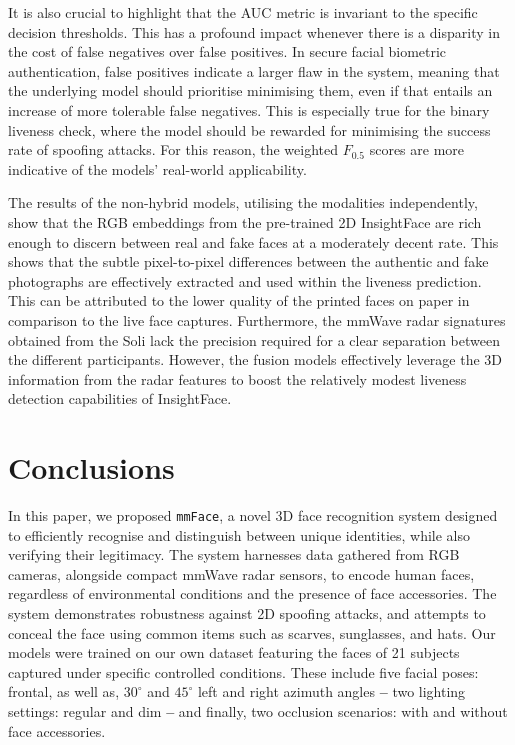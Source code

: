 \documentclass{mpaper}
\begin{document}
It is also crucial to highlight that the AUC metric is invariant to the specific decision thresholds. This has a profound impact whenever there is a disparity in the cost of false negatives over false positives. In secure facial biometric authentication, false positives indicate a larger flaw in the system, meaning that the underlying model should prioritise minimising them, even if that entails an increase of more tolerable false negatives. This is especially true for the binary liveness check, where the model should be rewarded for minimising the success rate of spoofing attacks. For this reason, the weighted $F_{0.5}$ scores are more indicative of the models' real-world applicability. 

The results of the non-hybrid models, utilising the modalities independently, show that the RGB embeddings from the pre-trained 2D InsightFace are rich enough to discern between real and fake faces at a moderately decent rate. This shows that the subtle pixel-to-pixel differences between the authentic and fake photographs are effectively extracted and used within the liveness prediction. This can be attributed to the lower quality of the printed faces on paper in comparison to the live face captures. Furthermore, the mmWave radar signatures obtained from the Soli lack the precision required for a clear separation between the different participants. However, the fusion models effectively leverage the 3D information from the radar features to boost the relatively modest liveness detection capabilities of InsightFace.



\section{Conclusions}
In this paper, we proposed \texttt{mmFace}, a novel 3D face recognition system designed to efficiently recognise and distinguish between unique identities, while also verifying their legitimacy. The system harnesses data gathered from RGB cameras, alongside compact mmWave radar sensors, to encode human faces, regardless of environmental conditions and the presence of face accessories. The system demonstrates robustness against 2D spoofing attacks, and attempts to conceal the face using common items such as scarves, sunglasses, and hats. Our models were trained on our own dataset featuring the faces of 21 subjects captured under specific controlled conditions. These include five facial poses: frontal, as well as, $30^\circ$ and $45^\circ$ left and right azimuth angles \textbf{--} two lighting settings: regular and dim \textbf{--} and finally, two occlusion scenarios: with and without face accessories.
\end{document}
